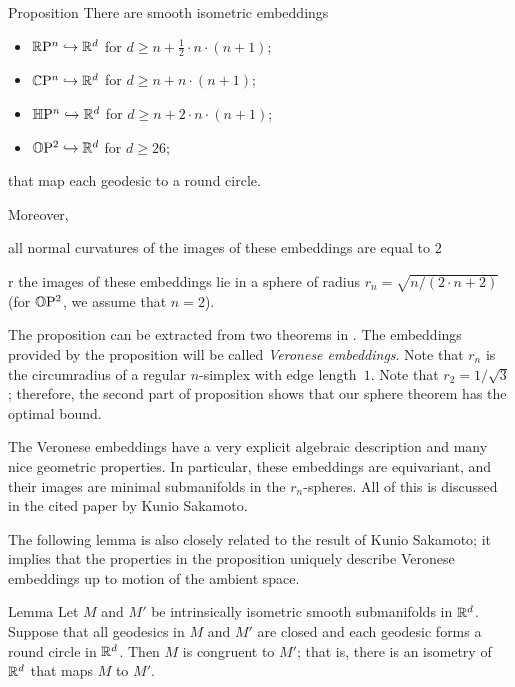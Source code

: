 \documentclass[a4paper,10pt]{article}
\begin{document}
\begin{thm}{Proposition}
There are smooth isometric embeddings
\begin{itemize}
 \item $\mathbb{R}\mathrm{P}^n \hookrightarrow\mathbb{R}^d$ for $d\ge n+\tfrac12\cdot n\cdot(n+1)$;
 \item $\mathbb{C}\mathrm{P}^n \hookrightarrow\mathbb{R}^d$ for $d\ge n+n\cdot(n+1)$;
 \item $\mathbb{H}\mathrm{P}^n \hookrightarrow\mathbb{R}^d$ for $d\ge n+2\cdot n\cdot(n+1)$;
 \item $\mathbb{O}\mathrm{P}^2 \hookrightarrow\mathbb{R}^d$ for $d\ge 26$;
\end{itemize}
that map each geodesic to a round circle.

Moreover,

\begin{subthm}{2}
all normal curvatures of the images of these embeddings are equal to $2$
\end{subthm}

\begin{subthm}{r}
the images of these embeddings lie in a sphere of radius $r_n=\sqrt{n/(2\cdot n+2)}$ (for $\mathbb{O}\mathrm{P}^2$, we assume that $n=2$).
\end{subthm}

\end{thm}

The proposition can be extracted from two theorems in \cite[§ 2]{sakamoto}.
The embeddings provided by the proposition will be called \emph{Veronese embeddings}.
Note that $r_n$ is the circumradius of a regular $n$-simplex with edge length~$1$.
Note that $r_2=1/\sqrt{3}$; therefore, the second part of proposition shows that our sphere theorem has the optimal bound. 

The Veronese embeddings have a very explicit algebraic description and many nice geometric properties.
In particular,
these embeddings are equivariant, and 
their images are minimal submanifolds in the $r_n$-spheres.
All of this is discussed in the cited paper by Kunio Sakamoto.

The following lemma is also closely related to the result of Kunio Sakamoto;
it implies that the properties in the proposition uniquely describe
Veronese embeddings up to motion of the ambient space.

\begin{thm}{Lemma}
Let $M$ and $M'$ be intrinsically isometric smooth submanifolds in $\mathbb{R}^d$.
Suppose that all geodesics in $M$ and $M'$ are closed
and each geodesic forms a round circle in $\mathbb{R}^d$.
Then $M$ is congruent to $M'$;
that is, there is an isometry of $\mathbb{R}^d$ that maps $M$ to $M'$.
\end{thm}
\end{document}
